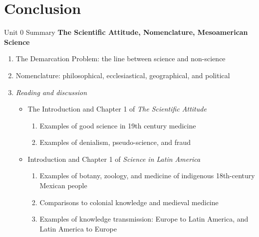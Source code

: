 \documentclass{beamer}
\begin{document}
\section{Conclusion}

\begin{frame}{Unit 0 Summary}
\footnotesize
\textbf{The Scientific Attitude, Nomenclature, Mesoamerican Science}
\begin{enumerate}
\item The Demarcation Problem: the line between science and non-science
\item Nomenclature: philosophical, ecclesiastical, geographical, and political
\item \textit{Reading and discussion}
\begin{itemize}
\footnotesize
\item \alert{The Introduction and Chapter 1 of \textit{The Scientific Attitude}}
\begin{enumerate}
\item Examples of good science in 19th century medicine
\item Examples of denialism, pseudo-science, and fraud
\end{enumerate}
\item \alert{Introduction and Chapter 1 of \textit{Science in Latin America}}
\begin{enumerate}
\item Examples of botany, zoology, and medicine of indigenous 18th-century Mexican people
\item Comparisons to colonial knowledge and medieval medicine
\item Examples of knowledge transmission: Europe to Latin America, and Latin America to Europe
\end{enumerate}
\end{itemize}
\end{enumerate}
\end{frame}
\end{document}
